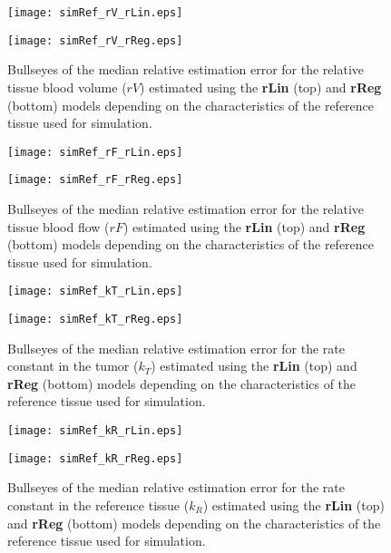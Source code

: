 \begin{subfigures}
    \begin{figure}
        \texttt{[image: simRef\_rV\_rLin.eps]}
        \par\vspace{1cm}
        \texttt{[image: simRef\_rV\_rReg.eps]}
        \caption{Bullseyes of the median relative estimation error for the relative tissue blood volume ($rV$) estimated using the \textbf{rLin} (top) and \textbf{rReg} (bottom) models depending on the characteristics of the reference tissue used for simulation.}
        \label{fig:referenceTissue_rV}
    \end{figure}
    \begin{figure}
        \texttt{[image: simRef\_rF\_rLin.eps]}
        \par\vspace{1cm}
        \texttt{[image: simRef\_rF\_rReg.eps]}
        \caption{Bullseyes of the median relative estimation error for the relative tissue blood flow ($rF$) estimated using the \textbf{rLin} (top) and \textbf{rReg} (bottom) models depending on the characteristics of the reference tissue used for simulation.}
        \label{fig:referenceTissue_rF}
    \end{figure}
    \begin{figure}
        \texttt{[image: simRef\_kT\_rLin.eps]}
        \par\vspace{1cm}
        \texttt{[image: simRef\_kT\_rReg.eps]}
        \caption{Bullseyes of the median relative estimation error for the rate constant in the tumor ($k_T$) estimated using the \textbf{rLin} (top) and \textbf{rReg} (bottom) models depending on the characteristics of the reference tissue used for simulation.}
        \label{fig:referenceTissue_kT}
    \end{figure}
    \begin{figure}
        \texttt{[image: simRef\_kR\_rLin.eps]}
        \par\vspace{1cm}
        \texttt{[image: simRef\_kR\_rReg.eps]}
        \caption{Bullseyes of the median relative estimation error for the rate constant in the reference tissue ($k_R$) estimated using the \textbf{rLin} (top) and \textbf{rReg} (bottom) models depending on the characteristics of the reference tissue used for simulation.}
        \label{fig:referenceTissue_kR}
    \end{figure}
\end{subfigures}


